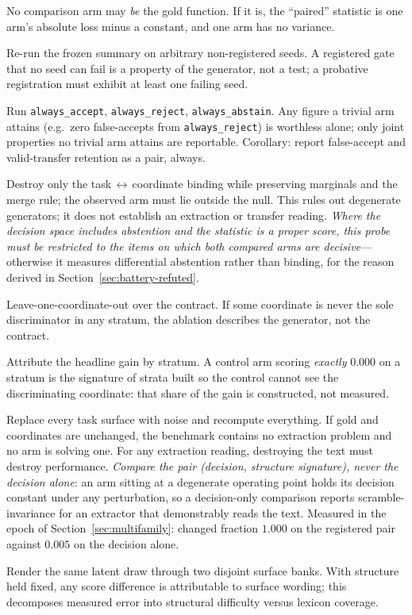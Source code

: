 \begin{description}[leftmargin=1.4em,style=nextline]
\item[A. Gold-arm distinctness] No comparison arm may \emph{be} the gold function. If it is, the ``paired'' statistic is one arm's absolute loss minus a constant, and one arm has no variance.
\item[B. Seed-failability] Re-run the frozen summary on arbitrary non-registered seeds. A registered gate that no seed can fail is a property of the generator, not a test; a probative registration must exhibit at least one failing seed.
\item[C. Trivial-arm floor] Run \texttt{always\_accept}, \texttt{always\_reject}, \texttt{always\_abstain}. Any figure a trivial arm attains (e.g.\ zero false-accepts from \texttt{always\_reject}) is worthless alone; only joint properties no trivial arm attains are reportable. Corollary: report false-accept and valid-transfer retention as a pair, always.
\item[D. Equal-$n$ shuffle null] Destroy only the task$\,\leftrightarrow\,$coordinate binding while preserving marginals and the merge rule; the observed arm must lie outside the null. This rules out degenerate generators; it does not establish an extraction or transfer reading. \emph{Where the decision space includes abstention and the statistic is a proper score, this probe must be restricted to the items on which both compared arms are decisive}---otherwise it measures differential abstention rather than binding, for the reason derived in Section~\ref{sec:battery-refuted}.
\item[E. Sole-discriminator map] Leave-one-coordinate-out over the contract. If some coordinate is never the sole discriminator in any stratum, the ablation describes the generator, not the contract.
\item[F. Construction-vs-measurement decomposition] Attribute the headline gain by stratum. A control arm scoring \emph{exactly} $0.000$ on a stratum is the signature of strata built so the control cannot see the discriminating coordinate: that share of the gain is constructed, not measured.
\item[G. Text destruction] Replace every task surface with noise and recompute everything. If gold and coordinates are unchanged, the benchmark contains no extraction problem and no arm is solving one. For any extraction reading, destroying the text must destroy performance. \emph{Compare the pair (decision, structure signature), never the decision alone}: an arm sitting at a degenerate operating point holds its decision constant under any perturbation, so a decision-only comparison reports scramble-invariance for an extractor that demonstrably reads the text. Measured in the epoch of Section~\ref{sec:multifamily}: changed fraction $1.000$ on the registered pair against $0.005$ on the decision alone.
\item[H. Matched-pair surface attribution] Render the same latent draw through two disjoint surface banks. With structure held fixed, any score difference is attributable to surface wording; this decomposes measured error into structural difficulty versus lexicon coverage.
\end{description}

